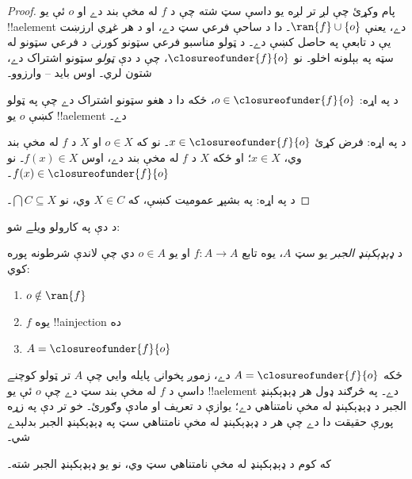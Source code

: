 \documentclass[../../../include/open-logic-section]{subfiles}
\begin{document}
\begin{proof}
پام وکړئ چې لږ تر لږه يو داسې سټ شته چې د $f$ له مخې بند دے او $o$
ئې يو !!a{element} دے، يعنې $\ran{f}\cup \{o\}$۔ دا د
ساحې فرعي سټ دے، او د هر غړي ارزښت يې د تابعې په حاصل کښې
دے۔ د ټولو مناسبو فرعي سټونو کورنۍ د فرعي سټونو له سټه په
بېلونه اخلو۔ نو $\closureofunder{f}{o}$، چې د دې \emph{ټولو}
سټونو اشتراک دے، شتون لري۔ اوس بايد -- وارزوو۔

د  په اړه: $o \in \closureofunder{f}{o}$،
ځکه دا د هغو سټونو اشتراک دے چې په ټولو کښې $o$ يو !!a{element} دے۔

د  په اړه: فرض کړئ $x \in
\closureofunder{f}{o}$۔ نو که $o \in X$ او $X$ د $f$ له مخې بند
وي، $x \in X$؛ او ځکه $X$ د $f$ له مخې بند دے، اوس $f(x) \in X$۔
نو $f(x) \in \closureofunder{f}{o}$۔

د  په اړه: په بشپړ عموميت کښې، که $X
\in C$ وي، نو $\bigcap C \subseteq X$۔
\end{proof}

د دې په کارولو ويلے شو:

\begin{defn}
د \emph{ډېډېکېنډ الجبر} يو سټ $A$، يوه تابع $f \colon A \to A$ او
يو $o \in A$ دي چې لاندې شرطونه پوره کوي:
	\begin{enumerate}
		\item {} $o \notin \ran{f}$
		\item {} $f$ يوه !!a{injection} ده
		\item {} $A = \closureofunder{f}{o}$
	\end{enumerate}
\end{defn}

ځکه $A = \closureofunder{f}{o}$ دے، زموږ پخوانۍ پايله وايي چې $A$
تر ټولو کوچنے داسې د $f$ له مخې بند سټ دے چې $o$ ئې يو !!a{element}
دے۔ په څرګند ډول هر ډېډېکېنډ الجبر د ډېډېکېنډ له مخې نامتناهي دے؛
يوازې د تعريف  او  مادې
وګورئ۔ خو تر دې په زړه پورې حقيقت دا دے چې هر د ډېډېکېنډ له مخې
نامتناهي سټ په ډېډېکېنډ الجبر بدلېدے شي۔

\begin{thm}
که کوم د ډېډېکېنډ له مخې نامتناهي سټ وي، نو يو ډېډېکېنډ الجبر شته۔
\end{thm}
\end{document}
